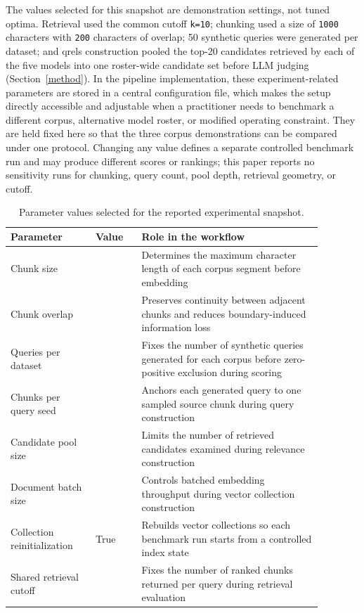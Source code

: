 The values selected for this snapshot are demonstration settings, not tuned optima. Retrieval used the common cutoff \texttt{k=10}; chunking used a size of \texttt{1000} characters with \texttt{200} characters of overlap; 50 synthetic queries were generated per dataset; and qrels construction pooled the top-20 candidates retrieved by each of the five models into one roster-wide candidate set before LLM judging (Section~\ref{method}). In the pipeline implementation, these experiment-related parameters are stored in a central configuration file, which makes the setup directly accessible and adjustable when a practitioner needs to benchmark a different corpus, alternative model roster, or modified operating constraint. They are held fixed here so that the three corpus demonstrations can be compared under one protocol. Changing any value defines a separate controlled benchmark run and may produce different scores or rankings; this paper reports no sensitivity runs for chunking, query count, pool depth, retrieval geometry, or cutoff.

\begin{table}[htbp]
\caption{Parameter values selected for the reported experimental snapshot.}\label{tbl:experiment_workflow_parameters}
\centering
\small
\begin{tabular}{@{}>{\raggedright\arraybackslash}p{0.24\linewidth}>{\raggedright\arraybackslash}p{0.13\linewidth}>{\raggedright\arraybackslash}p{0.51\linewidth}@{}}
\toprule
Parameter & Value & Role in the workflow \\
\midrule
Chunk size & 1000 & Determines the maximum character length of each corpus segment before embedding \\
Chunk overlap & 200 & Preserves continuity between adjacent chunks and reduces boundary-induced information loss \\
Queries per dataset & 50 & Fixes the number of synthetic queries generated for each corpus before zero-positive exclusion during scoring \\
Chunks per query seed & 1 & Anchors each generated query to one sampled source chunk during query construction \\
Candidate pool size & 20 & Limits the number of retrieved candidates examined during relevance construction \\
Document batch size & 32 & Controls batched embedding throughput during vector collection construction \\
Collection reinitialization & True & Rebuilds vector collections so each benchmark run starts from a controlled index state \\
Shared retrieval cutoff & 10 & Fixes the number of ranked chunks returned per query during retrieval evaluation \\
\bottomrule
\end{tabular}
\end{table}

